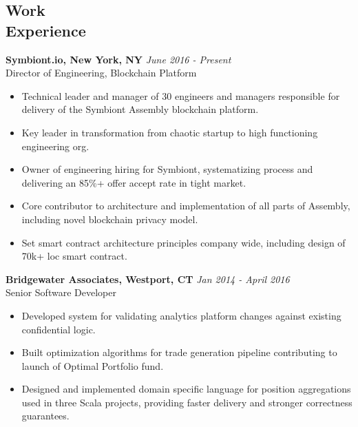 \documentclass[margin]{res}
\begin{document}
 
 

\address{{\bf Contact} \\ jobs@aarontodd.name \\ (415) 847-0997 }

\address{{\bf Address} \\ 70 Pine St. Apt 928 \\ New York, NY 10005 }


\begin{resume} 
  
\section{Work \\ Experience}

{\bf Symbiont.io, New York, NY} \hfill \textit{June 2016 - Present} \\
Director of Engineering, Blockchain Platform
\begin{itemize} 	\itemsep -2pt
\item Technical leader and manager of 30 engineers and managers responsible for delivery of the Symbiont Assembly blockchain platform.
\item Key leader in transformation from chaotic startup to high functioning engineering org.
\item Owner of engineering hiring for Symbiont, systematizing process and delivering an 85\%+ offer accept rate in tight market.
\item Core contributor to architecture and implementation of all parts of Assembly, including novel blockchain privacy model.
\item Set smart contract architecture principles company wide, including design of 70k+ loc smart contract. 
\end{itemize}

 {\bf Bridgewater Associates, Westport, CT} \hfill \textit{Jan 2014 - April 2016} \\
 Senior Software Developer
 \begin{itemize} \itemsep -2pt  %
 \item Developed system for validating analytics platform changes against existing confidential logic.
 \item Built optimization algorithms for trade generation pipeline contributing to launch of Optimal Portfolio fund.
 \item Designed and implemented domain specific language for position aggregations used in three Scala projects, providing faster delivery and stronger correctness guarantees.
 \end{itemize}


\end{resume}
\end{document}
